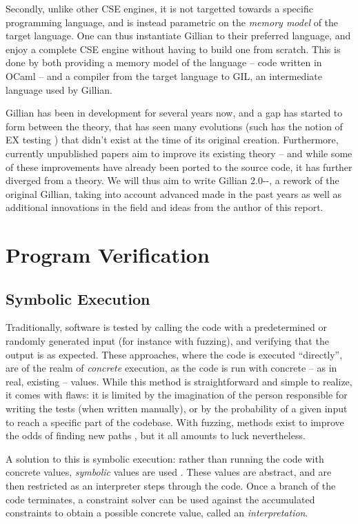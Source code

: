 Secondly, unlike other CSE engines, it is not targetted towards a specific programming language, and is instead parametric on the \emph{memory model} of the target language. One can thus instantiate Gillian to their preferred language, and enjoy a complete CSE engine without having to build one from scratch. This is done by both providing a memory model of the language -- code written in OCaml -- and a compiler from the target language to GIL, an intermediate language used by Gillian.

Gillian has been in development for several years now, and a gap has started to form between the theory, that has seen many evolutions (such has the notion of EX testing \cite{exactsl}) that didn't exist at the time of its original creation. Furthermore, currently unpublished papers aim to improve its existing theory -- and while some of these improvements have already been ported to the source code, it has further diverged from a theory. We will thus aim to write Gillian 2.0{-}{-}, a rework of the original Gillian, taking into account advanced made in the past years as well as additional innovations in the field and ideas from the author of this report.


\section{Program Verification}


\subsection{Symbolic Execution}

Traditionally, software is tested by calling the code with a predetermined or randomly generated input (for instance with fuzzing), and verifying that the output is as expected. These approaches, where the code is executed ``directly'', are of the realm of \emph{concrete} execution, as the code is run with concrete -- as in real, existing -- values. While this method is straightforward and simple to realize, it comes with flaws: it is limited by the imagination of the person responsible for writing the tests (when written manually), or by the probability of a given input to reach a specific part of the codebase. With fuzzing, methods exist to improve the odds of finding new paths \cite{smartfuzzing}, but it all amounts to luck nevertheless.

A solution to this is symbolic execution: rather than running the code with concrete values, \emph{symbolic} values are used \cite{surveysymex}. These values are abstract, and are then restricted as an interpreter steps through the code. Once a branch of the code terminates, a constraint solver can be used against the accumulated constraints to obtain a possible concrete value, called an \emph{interpretation}.

